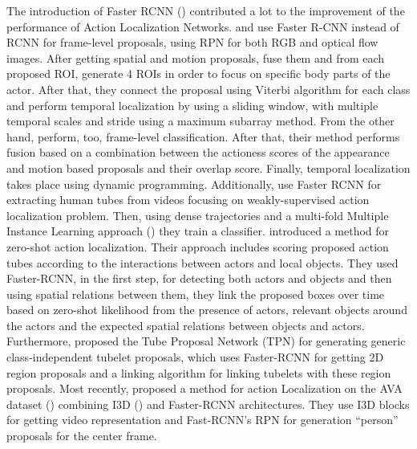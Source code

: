 The introduction of Faster RCNN (\cite{Ren:2015:FRT:2969239.2969250}) contributed a lot to the improvement of the performance of Action Localization Networks.
\cite{peng:hal-01349107} and \cite{DBLP:journals/corr/SahaSSTC16}   use Faster R-CNN  instead of RCNN
for frame-level proposals, using RPN for both RGB and optical flow images.
After getting spatial and motion proposals, \cite{peng:hal-01349107} fuse them  and from each proposed ROI, generate 4 ROIs in order to focus on specific
body parts of the actor. After that, they connect the proposal using Viterbi algorithm for each class and perform temporal localization by using a sliding window, with multiple
temporal scales and stride using a maximum subarray method. From the other hand, \cite{DBLP:journals/corr/SahaSSTC16} perform, too, frame-level classification. After that,
their method performs fusion based on a combination between the actioness scores of the appearance and motion based proposals and their overlap score. Finally, temporal localization
takes place using dynamic programming. Additionally, \cite{DBLP:journals/corr/WeinzaepfelMS16} use
Faster RCNN for extracting human tubes from videos focusing  on weakly-supervised action localization problem.
Then, using dense trajectories and a  multi-fold Multiple  Instance  Learning approach (\cite{7420739}) they train a classifier.
\cite{DBLP:journals/corr/MettesS17} introduced a method for zero-shot action localization. Their approach includes scoring proposed action tubes according to the interactions between
actors and local objects. They used Faster-RCNN, in the first step, for detecting both actors and objects and then using spatial relations between them, they link the proposed boxes over
time based on zero-shot likelihood from the presence of actors, relevant objects around the actors and the expected spatial relations between objects and actors.
Furthermore, \cite{DBLP:journals/corr/HeIDM17} proposed the Tube Proposal Network (TPN) for generating generic class-independent tubelet proposals, which uses Faster-RCNN for getting
2D region proposals and a linking algorithm for linking tubelets with these region proposals. Most recently, \cite{DBLP:journals/corr/abs-1807-10066} proposed a method for action Localization
on the AVA dataset (\cite{DBLP:journals/corr/GuSVPRTLRSSM17}) combining I3D (\cite{DBLP:journals/corr/CarreiraZ17}) and Faster-RCNN architectures. They use I3D blocks for getting video representation
and Fast-RCNN's RPN for generation ``person'' proposals for the center frame.
\par

